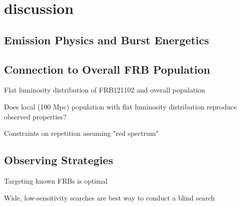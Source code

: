 \section{discussion}

\subsection{Emission Physics and Burst Energetics}



\subsection{Connection to Overall FRB Population}

Flat luminosity distribution of FRB121102 and overall population

Does local (100 Mpc) population with flat luminosity distribution reproduce observed properties?

Constraints on repetition assuming "red spectrum"

\subsection{Observing Strategies}

Targeting known FRBs is optimal

Wide, low-sensitivity searches are best way to conduct a blind search